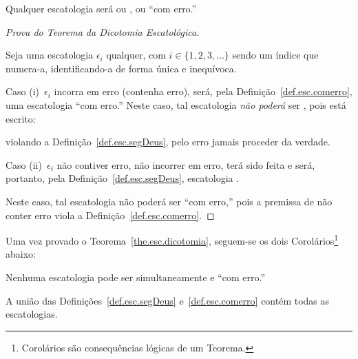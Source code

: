     \begin{THE}
        \label{the.esc.dicotomia}
        Qualquer escatologia será ou , ou ``com erro.''
    \end{THE}

    \begin{proof}[Prova do Teorema da Dicotomia Escatológica]
        \label{pro.the.dicotomia}

        Seja uma escatologia $\epsilon_i$ qualquer, com $i \in \{1, 2, 3, \ldots\}$ sendo um  índice  que  numera-a,
        identificando-a de forma única e inequívoca.

        Caso (i)~$\epsilon_i$ incorra em erro  (contenha  erro),  será,  pela  Definição~\ref{def.esc.comerro},  uma
        escatologia ``com erro.'' Neste caso, tal escatologia \emph{não poderá} ser , pois está
        escrito:


        \noindent violando a Definição~\ref{def.esc.segDeus}, pelo erro jamais proceder da verdade.

        Caso (ii)~$\epsilon_i$ não contiver erro, não incorrer em erro, terá sido feita     e     será,     portanto,     pela
        Definição~\ref{def.esc.segDeus}, escatologia .

        Neste caso, tal escatologia não poderá ser ``com erro,'' pois a premissa de não conter erro viola a
        Definição~\ref{def.esc.comerro}.

    \end{proof}

    Uma vez provado o Teorema~\ref{the.esc.dicotomia}, seguem-se os dois Corolários\footnote{Corolários são consequências
    lógicas de um Teorema.} abaixo:

    \begin{COR}
        \label{cor.dicotomia.1}
        Nenhuma escatologia pode ser simultaneamente  e ``com erro.''
    \end{COR}

    \begin{COR}
        \label{cor.dicotomia.2}
        A união das Definições~\ref{def.esc.segDeus} e~\ref{def.esc.comerro} contém todas as escatologias.
    \end{COR}

